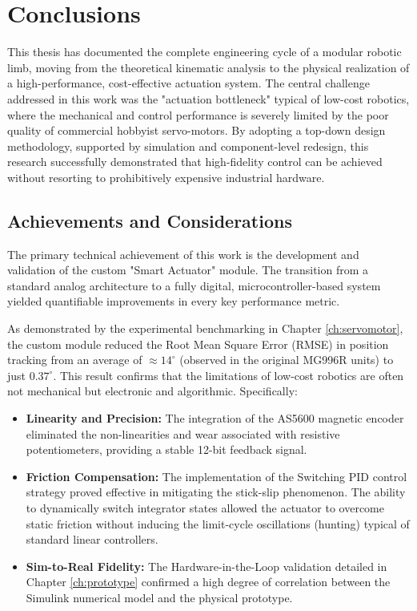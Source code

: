 \chapter{Conclusions}
\label{ch:conclusions}

This thesis has documented the complete engineering cycle of a modular robotic limb, moving from the theoretical
kinematic analysis to the physical realization of a high-performance, cost-effective actuation system. The central
challenge addressed in this work was the "actuation bottleneck" typical of low-cost robotics, where the mechanical
and control performance is severely limited by the poor quality of commercial hobbyist servo-motors. By adopting a
top-down design methodology, supported by simulation and component-level redesign, this research successfully
demonstrated that high-fidelity control can be achieved without resorting to prohibitively expensive industrial
hardware.


\section{Achievements and Considerations}

The primary technical achievement of this work is the development and validation of the custom "Smart Actuator" module.
The transition from a standard analog architecture to a fully digital, microcontroller-based system yielded quantifiable
improvements in every key performance metric.

As demonstrated by the experimental benchmarking in Chapter \ref{ch:servomotor}, the custom module reduced the Root
Mean Square Error (RMSE) in position tracking from an average of $\approx 14^{\circ}$ (observed in the original MG996R
units) to just $0.37^{\circ}$. This result confirms that the limitations of low-cost robotics are often not mechanical
but electronic and algorithmic. Specifically:

\begin{itemize}
    \item \textbf{Linearity and Precision:} The integration of the AS5600 magnetic encoder eliminated the
        non-linearities and wear associated with resistive potentiometers, providing a stable 12-bit feedback
        signal.
    \item \textbf{Friction Compensation:} The implementation of the Switching PID control strategy proved effective in
        mitigating the stick-slip phenomenon. The ability to dynamically switch integrator states allowed the actuator
        to overcome static friction without inducing the limit-cycle oscillations (hunting) typical of standard linear
        controllers.
    \item \textbf{Sim-to-Real Fidelity:} The Hardware-in-the-Loop validation detailed in Chapter \ref{ch:prototype}
        confirmed a high degree of correlation between the Simulink numerical model and the physical prototype.
\end{itemize}


